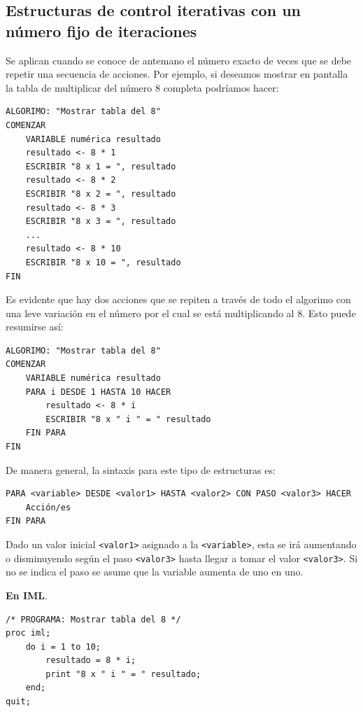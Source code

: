 \documentclass[]{book}
\begin{document}
\subsection{Estructuras de control iterativas con un número fijo de
iteraciones}\label{estructuras-de-control-iterativas-con-un-numero-fijo-de-iteraciones}

Se aplican cuando se conoce de antemano el número exacto de veces que se
debe repetir una secuencia de acciones. Por ejemplo, si deseamos mostrar
en pantalla la tabla de multiplicar del número 8 completa podríamos
hacer:

\begin{verbatim}
ALGORIMO: "Mostrar tabla del 8"
COMENZAR
    VARIABLE numérica resultado
    resultado <- 8 * 1
    ESCRIBIR "8 x 1 = ", resultado
    resultado <- 8 * 2
    ESCRIBIR "8 x 2 = ", resultado
    resultado <- 8 * 3
    ESCRIBIR "8 x 3 = ", resultado
    ...
    resultado <- 8 * 10
    ESCRIBIR "8 x 10 = ", resultado
FIN
\end{verbatim}

Es evidente que hay dos acciones que se repiten a través de todo el
algorimo con una leve variación en el número por el cual se está
multiplicando al 8. Esto puede resumirse así:

\begin{verbatim}
ALGORIMO: "Mostrar tabla del 8"
COMENZAR
    VARIABLE numérica resultado
    PARA i DESDE 1 HASTA 10 HACER
        resultado <- 8 * i
        ESCRIBIR "8 x " i " = " resultado
    FIN PARA
FIN
\end{verbatim}

De manera general, la sintaxis para este tipo de estructuras es:

\begin{verbatim}
PARA <variable> DESDE <valor1> HASTA <valor2> CON PASO <valor3> HACER
    Acción/es
FIN PARA
\end{verbatim}

Dado un valor inicial \texttt{\textless{}valor1\textgreater{}} asignado
a la \texttt{\textless{}variable\textgreater{}}, esta se irá aumentando
o disminuyendo según el paso \texttt{\textless{}valor3\textgreater{}}
hasta llegar a tomar el valor \texttt{\textless{}valor3\textgreater{}}.
Si no se indica el paso se asume que la variable aumenta de uno en uno.

\textbf{En IML}.

\begin{verbatim}
/* PROGRAMA: Mostrar tabla del 8 */
proc iml;
    do i = 1 to 10;
        resultado = 8 * i;
        print "8 x " i " = " resultado;
    end;
quit;
\end{verbatim}
\end{document}

